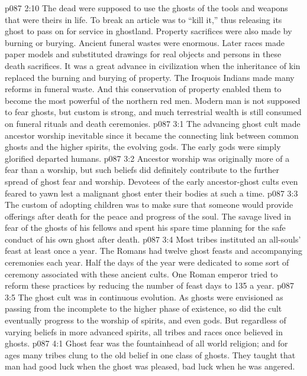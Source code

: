 \vs p087 2:10 The dead were supposed to use the ghosts of the tools and weapons that were theirs in life. To break an article was to “kill it,” thus releasing its ghost to pass on for service in ghostland. Property sacrifices were also made by burning or burying. Ancient funeral wastes were enormous. Later races made paper models and substituted drawings for real objects and persons in these death sacrifices. It was a great advance in civilization when the inheritance of kin replaced the burning and burying of property. The Iroquois Indians made many reforms in funeral waste. And this conservation of property enabled them to become the most powerful of the northern red men. Modern man is not supposed to fear ghosts, but custom is strong, and much terrestrial wealth is still consumed on funeral rituals and death ceremonies.
\vs p087 3:1 The advancing ghost cult made ancestor worship inevitable since it became the connecting link between common ghosts and the higher spirits, the evolving gods. The early gods were simply glorified departed humans.
\vs p087 3:2 Ancestor worship was originally more of a fear than a worship, but such beliefs did definitely contribute to the further spread of ghost fear and worship. Devotees of the early ancestor\hyp{}ghost cults even feared to yawn lest a malignant ghost enter their bodies at such a time.
\vs p087 3:3 The custom of adopting children was to make sure that someone would provide offerings after death for the peace and progress of the soul. The savage lived in fear of the ghosts of his fellows and spent his spare time planning for the safe conduct of his own ghost after death.
\vs p087 3:4 Most tribes instituted an all\hyp{}souls’ feast at least once a year. The Romans had twelve ghost feasts and accompanying ceremonies each year. Half the days of the year were dedicated to some sort of ceremony associated with these ancient cults. One Roman emperor tried to reform these practices by reducing the number of feast days to 135 a year.
\vs p087 3:5 \pc The ghost cult was in continuous evolution. As ghosts were envisioned as passing from the incomplete to the higher phase of existence, so did the cult eventually progress to the worship of spirits, and even gods. But regardless of varying beliefs in more advanced spirits, all tribes and races once believed in ghosts.
\vs p087 4:1 Ghost fear was the fountainhead of all world religion; and for ages many tribes clung to the old belief in one class of ghosts. They taught that man had good luck when the ghost was pleased, bad luck when he was angered.
